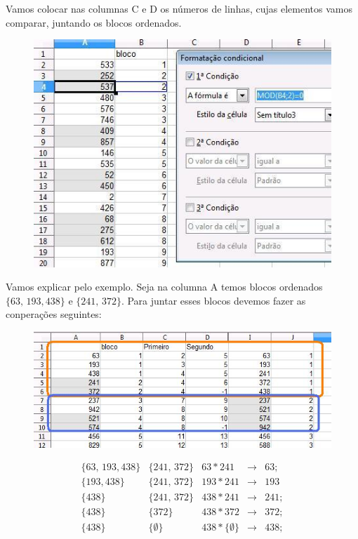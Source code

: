 \documentclass[12pt]{article}
\begin{document}
Vamos colocar nas columnas C e D os n\'umeros de linhas, cujas
elementos vamos comparar, juntando os blocos ordenados.

\begin{figure}[htb]
\begin{center}
\includegraphics{./imgs/pic2}
\end{center}
\caption{}
\end{figure}

Vamos explicar pelo exemplo. Seja na columna A temos blocos
ordenados $\{63,\, 193, 438\}$ e $\{241,\, 372\}$. Para juntar
esses blocos devemos fazer as conpera\c{c}\~oes seguintes:

\begin{figure}[htb]
\begin{center}
\includegraphics{./imgs/pic3}
\end{center}
\caption{}\label{pic3}
\end{figure}

$$
\begin{array}{lllll}
\{63,\, 193, 438\}& \{241,\, 372\}& 63 * 241 &\longrightarrow &
63;\\
\{193, 438\}& \{241,\, 372\}& 193 * 241 &\longrightarrow& 193
\\
\{438\}& \{241,\, 372\}& 438 * 241 &\longrightarrow & 241;
\\
\{438\}& \{372\}& 438 * 372& \longrightarrow& 372;
\\
\{438\}& \{\emptyset \}& 438 * \{\emptyset\}& \longrightarrow&
438;
\end{array}$$
\end{document}
